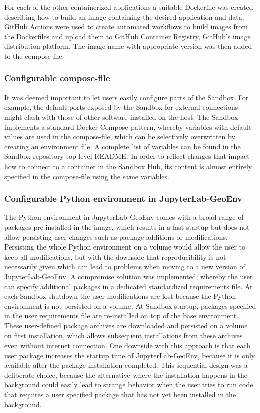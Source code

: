 \documentclass[11pt, a4paper, oneside, parskip=full-]{scrartcl}
\begin{document}
For each of the other containerized applications a suitable Dockerfile was
created describing how to build an image containing the desired application and
data. GitHub Actions\cite{githubactions} were used to create automated workflows
to build images from the Dockerfiles and upload them to GitHub Container
Registry\cite{gcr}, GitHub's image distribution platform. The image name with
appropriate version was then added to the compose-file.

\subsubsection*{Configurable compose-file}
It was deemed important to let users easily configure parts of the Sandbox. For
example, the default ports exposed by the Sandbox for external connections might
clash with those of other software installed on the host. The Sandbox implements
a standard Docker Compose pattern, whereby variables with default values are
used in the compose-file, which can be selectively overwritten by creating an
environment file\cite{composeenvfile}. A complete list of variables can be found
in the Sandbox repository top level README\cite{osgeostacksandbox}. In order to
reflect changes that impact how to connect to a container in the Sandbox Hub,
its content is almost entirely specified in the compose-file using the same
variables.

\subsubsection*{Configurable Python environment in JupyterLab-GeoEnv}
The Python environment in JupyterLab-GeoEnv comes with a broad range of packages
pre-installed in the image, which results in a fast startup but does not allow
persisting user changes such as package additions or modifications. Persisting
the whole Python environment on a volume would allow the user to keep all
modifications, but with the downside that reproducibility is not necessarily
given which can lead to problems when moving to a new version of
JupyterLab-GeoEnv. A compromise solution was implemented, whereby the user can
specify additional packages in a dedicated standardized requirements
file\cite{piprequirementsfile}. At each Sandbox shutdown the user modifications
are lost because the Python environment is not persisted on a volume. At Sandbox
startup, packages specified in the user requirements file are re-installed on
top of the base environment. These user-defined package archives are downloaded
and persisted on a volume on first installation, which allows subsequent
installations from these archives even without internet connection. One downside
with this approach is that each user package increases the startup time of
JupyterLab-GeoEnv, because it is only available after the package installation
completed. This sequential design was a deliberate choice, because the
alternative where the installation happens in the background could easily lead
to strange behavior when the user tries to run code that requires a user
specified package that has not yet been installed in the background.
\end{document}
